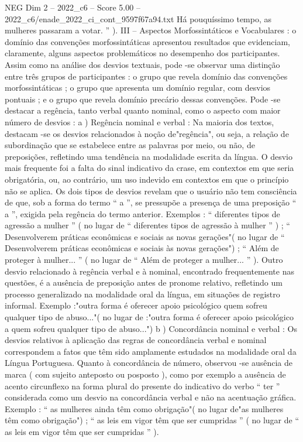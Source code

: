 \begin{textsample}{NEG Dim 2 – 2022\_c6 – Score 5.00 – 2022\_c6/enade\_2022\_ci\_cont\_9597f67a94.txt}
Há pouquíssimo tempo, as mulheres passaram a votar. ” ).
III – Aspectos Morfossintáticos e Vocabulares : o domínio das convenções morfossintáticas apresentou resultados que evidenciam, claramente, alguns aspectos problemáticos no desempenho dos participantes.
Assim como na análise dos desvios textuais, pode -se observar uma distinção entre três grupos de participantes : o grupo que revela domínio das convenções morfossintáticas ; o grupo que apresenta um domínio regular, com desvios pontuais ; e o grupo que revela domínio precário dessas convenções.
Pode -se destacar a regência, tanto verbal quanto nominal, como o aspecto com maior número de desvios : a ) Regência nominal e verbal : Na maioria dos textos, destacam -se os desvios relacionados à noção de"regência", ou seja, a relação de subordinação que se estabelece entre as palavras por meio, ou não, de preposições, refletindo uma tendência na modalidade escrita da língua.
O desvio mais frequente foi a falta do sinal indicativo da crase, em contextos em que seria obrigatória, ou, ao contrário, um uso indevido em contextos em que o princípio não se aplica.
Os dois tipos de desvios revelam que o usuário não tem consciência de que, sob a forma do termo “ a ”, se pressupõe a presença de uma preposição “ a ”, exigida pela regência do termo anterior.
Exemplos : “ diferentes tipos de agressão a mulher ” ( no lugar de “ diferentes tipos de agressão à mulher ” ) ; “ Desenvolverem práticas econômicas e sociais as novas gerações"( no lugar de “ Desenvolverem práticas econômicas e sociais às novas gerações") ; “ Além de proteger à mulher... ” ( no lugar de “ Além de proteger a mulher... ” ).
Outro desvio relacionado à regência verbal e à nominal, encontrado frequentemente nas questões, é a ausência de preposição antes de pronome relativo, refletindo um processo generalizado na modalidade oral da língua, em situações de registro informal.
Exemplo :"outra forma é oferecer apoio psicológico quem sofreu qualquer tipo de abuso..."( no lugar de :"outra forma é oferecer apoio psicológico a quem sofreu qualquer tipo de abuso...") b ) Concordância nominal e verbal : Os desvios relativos à aplicação das regras de concordância verbal e nominal correspondem a fatos que têm sido amplamente estudados na modalidade oral da Língua Portuguesa.
Quanto à concordância de número, observou -se ausência de marca ( com sujeito anteposto ou posposto ), como por exemplo a ausência de acento circunflexo na forma plural do presente do indicativo do verbo “ ter ” considerada como um desvio na concordância verbal e não na acentuação gráfica.
Exemplo : “ as mulheres ainda têm como obrigação"( no lugar de"as mulheres têm como obrigação") ; “ as leis em vigor têm que ser cumpridas ” ( no lugar de “ as leis em vigor têm que ser cumpridas ” ).

\end{textsample}
